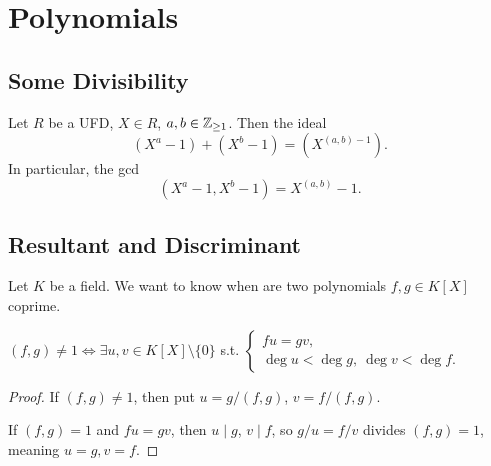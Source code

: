 \section{Polynomials}

\subsection{Some Divisibility}

\begin{proposition}\label{(Xa - 1 Xb - 1) = X(a b) - 1}
    Let $R$ be a UFD, $X\in R$, $a, b\in\mathbb{Z}_{\ge 1}$.
    Then the ideal \[(X^a - 1) + (X^b - 1) = \left(X^{(a, b) - 1}\right).\]
    In particular, the gcd \[\left( X^a - 1, X^b - 1 \right) = X^{(a, b)} - 1.\]
\end{proposition}

\subsection{Resultant and Discriminant}
Let $K$ be a field.
We want to know when are two polynomials $f, g\in K[X]$ coprime.
\begin{lemma}\label{not coprime over field iff fu = gv}
    $(f, g)\ne 1\iff \exists u, v\in K[X]\setminus \{0\}$ s.t. \(\begin{cases}
        fu = gv,\\ 
        \deg u <\deg g,\ \deg v < \deg f.
    \end{cases}\)
\end{lemma}
\begin{proof}
    If $(f, g) \ne 1$, then put $u = g/(f, g)$, $v = f/(f, g)$.

    If $(f, g) = 1$ and $fu = gv$, then $u\mid g$, $v\mid f$, so $g/u = f/v$ divides $(f, g) = 1$,
    meaning $u = g, v = f$.
\end{proof}

